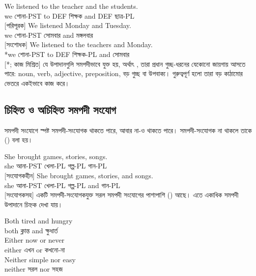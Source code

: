 \ea \label{ex:coord-function-bn}
    \ea \gll We listened {\ob}to the teacher{\cb} {\ob}and the students{\cb}.\\
        we শোনা-PST to DEF শিক্ষক and DEF ছাত্র-PL\\
    \glt {} [পরিপূরক]
    \ex \gll We listened {\ob}Monday{\cb} and {\ob}Tuesday{\cb}.\\
        we শোনা-PST সোমবার and মঙ্গলবার\\
    \glt {} [সংশোধক]
    \ex \gll *We listened {\ob}to the teachers{\cb} and {\ob}Monday{\cb}.\\
        *we শোনা-PST to DEF শিক্ষক-PL and সোমবার\\
    \glt {} [*; কাজ মিশ্রিত]
    \z
\z
যে উপাদানগুলি সমপদীভাবে যুক্ত হয়, অর্থাৎ , তারা প্রধান গুচ্ছ-ধরনের যেকোনো জায়গায় আসতে পারে: noun, verb, adjective, preposition, বড় গুচ্ছ বা উপবাক্য। গুরুত্বপূর্ণ হলো তারা বড় কাঠামোর ভেতরে একইভাবে কাজ করে।

\subsection{চিহ্নিত ও অচিহ্নিত সমপদী সংযোগ}

সমপদী সংযোগে স্পষ্ট সমপদী-সংযোগক থাকতে পারে, আবার না-ও থাকতে পারে। সমপদী-সংযোগক না থাকলে তাকে  () বলা হয়।

\ea \label{ex:coord-marking-bn}
    \ea \gll She brought {\ob}games{\cb}, {\ob}stories{\cb}, {\ob}songs{\cb}.\\
        she আনা-PST খেলা-PL গল্প-PL গান-PL\\
    \glt {} [সংযোগকহীন]
    \ex \gll She brought {\ob}games{\cb}, {\ob}stories{\cb}, and {\ob}songs{\cb}.\\
        she আনা-PST খেলা-PL গল্প-PL and গান-PL\\
    \glt {} [সংযোগকসহ]
    \z
\z
একটি সমপদী-সংযোগকযুক্ত সরল সমপদী সংযোগের পাশাপাশি  () আছে। এতে একাধিক সমপদী উপাদানে চিহ্নক দেখা যায়।

\ea \label{ex:coord-correlative-bn}
    \ea \gll {\ob}Both{\cb} tired {\ob}and{\cb} hungry\\
        both ক্লান্ত and ক্ষুধার্ত\\
    \glt {}
    \ex \gll {\ob}Either{\cb} now {\ob}or{\cb} never\\
        either এখন or কখনো-না\\
    \glt {}
    \ex \gll {\ob}Neither{\cb} simple {\ob}nor{\cb} easy\\
        neither সরল nor সহজ\\
    \glt {}
    \z
\z

